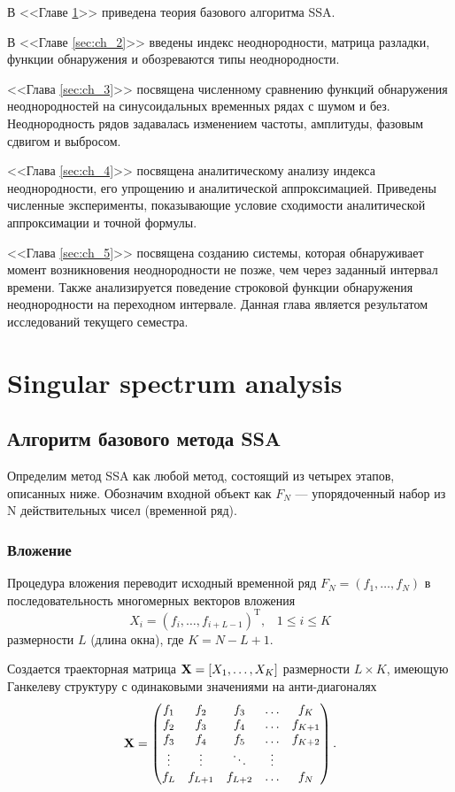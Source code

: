 \documentclass[specialist, substylefile = spbu.rtx,
			   subf, href, 12pt]{disser}
\begin{document}
В <<Главе \ref{sec:ch_1}>> приведена теория базового алгоритма SSA.

В <<Главе \ref{sec:ch_2}>> введены индекс неоднородности, матрица разладки, функции обнаружения и обозреваются типы неоднородности.

<<Глава \ref{sec:ch_3}>> посвящена численному сравнению функций обнаружения неоднородностей на синусоидальных временных рядах с шумом и без. Неоднородность рядов задавалась изменением частоты, амплитуды, фазовым сдвигом и выбросом.

<<Глава \ref{sec:ch_4}>> посвящена аналитическому анализу индекса неоднородности, его упрощению и аналитической аппроксимацией. Приведены численные эксперименты, показывающие условие сходимости аналитической аппроксимации и точной формулы.

<<Глава \ref{sec:ch_5}>> посвящена созданию системы, которая обнаруживает момент возникновения неоднородности не позже, чем через заданный интервал времени. Также анализируется поведение строковой функции обнаружения неоднородности на переходном интервале. Данная глава является результатом исследований текущего семестра.


\newpage
\chapter{Singular spectrum analysis} \label{sec:ch_1}
\section{Алгоритм базового метода SSA}
Определим метод SSA как любой метод, состоящий из четырех этапов, описанных ниже. Обозначим входной объект как $F_N$ --- упорядоченный набор из $\mathrm{N}$ действительных чисел (временной ряд).

\subsection{Вложение}
\label{step:Embedding}

Процедура вложения переводит исходный временной ряд $F_N = (f_1, \dotsc, f_{N})$ в последовательность многомерных векторов вложения
$$X_i = (f_{i}, \dotsc, f_{i+L-1})^\mathrm{T}, \;\;\; 1 \leq i \leq K$$
размерности $L$ (длина окна), где $K = N - L + 1$. 

Создается траекторная матрица $\bold{X} = [X_1, \dotsc, X_K]$ размерности $L \times K$, имеющую Ганкелеву структуру с одинаковыми значениями на анти-диагоналях
\begin{equation}\label{eq:traj_m}
	\bold{X} =
	\begin{pmatrix}
		f_{1} & f_{2} & f_{3} & \ldots & f_{K}\\
		f_{2} & f_{3} & f_{4} & \ldots & f_{K+1}\\
		f_{3} & f_{4} & f_{5} & \ldots & f_{K+2}\\
		\vdots & \vdots & \ddots & \vdots\\
		f_{L} & f_{L+1} & f_{L+2} & \ldots & f_{N}
	\end{pmatrix}.
\end{equation}
\end{document}

